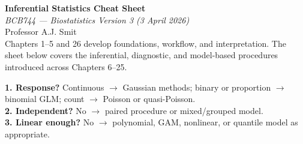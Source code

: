 \documentclass[9pt,landscape]{extarticle}
\newlength{\tableblockwidth}
\newlength{\tableoffset}
\newlength{\headerleftwidth}
\newlength{\headergap}
\newlength{\headerrightwidth}
\begin{document}
\noindent\hspace*{\tableoffset}%
\begin{minipage}{\tableblockwidth}
\begin{minipage}[t]{\headerleftwidth}
  \vspace{0pt}
  \raggedright
  {\Huge\sffamily\bfseries\color{headbg} Inferential Statistics Cheat Sheet}\\
  {\large\itshape BCB744 --- Biostatistics Version 3 (3 April 2026)}\\
  {\small Professor A.J. Smit}\\
  {\small Chapters 1--5 and 26 develop foundations, workflow, and interpretation. The sheet below covers the inferential, diagnostic, and model-based procedures introduced across Chapters 6--25.}
\end{minipage}%
\hspace*{\headergap}%
\begin{minipage}[t]{\headerrightwidth}
  \vspace*{-2.5mm}
  \begin{decisionbox}
    \small\sffamily
    \textbf{1. Response?} Continuous \(\rightarrow\) Gaussian methods; binary or proportion \(\rightarrow\) binomial GLM; count \(\rightarrow\) Poisson or quasi-Poisson.\\
    \textbf{2. Independent?} No \(\rightarrow\) paired procedure or mixed/grouped model.\\
    \textbf{3. Linear enough?} No \(\rightarrow\) polynomial, GAM, nonlinear, or quantile model as appropriate.
  \end{decisionbox}
\end{minipage}
\end{minipage}

\vspace{8pt}
\end{document}
